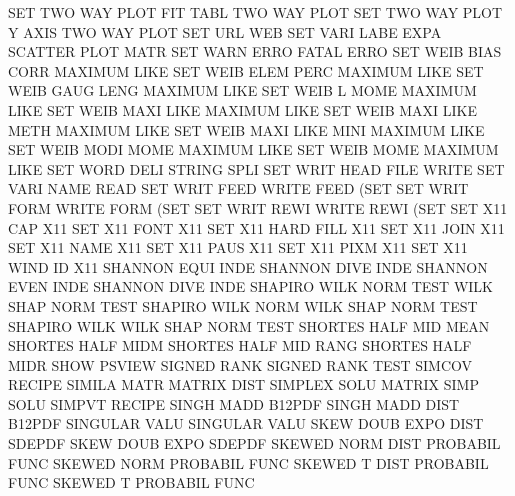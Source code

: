 SET      TWO  WAY  PLOT FIT  TABL       TWO      WAY  PLOT
SET      TWO  WAY  PLOT Y    AXIS       TWO      WAY  PLOT
SET      URL                            WEB
SET      VARI LABE EXPA                 SCATTER  PLOT MATR
SET      WARN ERRO                      FATAL    ERRO
SET      WEIB BIAS CORR                 MAXIMUM  LIKE
SET      WEIB ELEM PERC                 MAXIMUM  LIKE
SET      WEIB GAUG LENG                 MAXIMUM  LIKE
SET      WEIB L    MOME                 MAXIMUM  LIKE
SET      WEIB MAXI LIKE                 MAXIMUM  LIKE
SET      WEIB MAXI LIKE METH            MAXIMUM  LIKE
SET      WEIB MAXI LIKE MINI            MAXIMUM  LIKE
SET      WEIB MODI MOME                 MAXIMUM  LIKE
SET      WEIB MOME                      MAXIMUM  LIKE
SET      WORD DELI                      STRING   SPLI
SET      WRIT HEAD FILE                 WRITE
SET      VARI NAME                      READ
SET      WRIT FEED                      WRITE    FEED (SET
SET      WRIT FORM                      WRITE    FORM (SET
SET      WRIT REWI                      WRITE    REWI (SET
SET      X11  CAP                       X11
SET      X11  FONT                      X11
SET      X11  HARD FILL                 X11
SET      X11  JOIN                      X11
SET      X11  NAME                      X11
SET      X11  PAUS                      X11
SET      X11  PIXM                      X11
SET      X11  WIND ID                   X11
SHANNON  EQUI INDE                      SHANNON  DIVE INDE
SHANNON  EVEN INDE                      SHANNON  DIVE INDE
SHAPIRO  WILK NORM TEST                 WILK     SHAP NORM TEST
SHAPIRO  WILK NORM                      WILK     SHAP NORM TEST
SHAPIRO  WILK                           WILK     SHAP NORM TEST
SHORTES  HALF MID  MEAN                 SHORTES  HALF MIDM
SHORTES  HALF MID  RANG                 SHORTES  HALF MIDR
SHOW                                    PSVIEW
SIGNED   RANK                           SIGNED   RANK TEST
SIMCOV                                  RECIPE
SIMILA   MATR                           MATRIX   DIST
SIMPLEX  SOLU                           MATRIX   SIMP SOLU
SIMPVT                                  RECIPE
SINGH    MADD                           B12PDF
SINGH    MADD DIST                      B12PDF
SINGULAR VALU                           SINGULAR VALU
SKEW     DOUB EXPO DIST                 SDEPDF
SKEW     DOUB EXPO                      SDEPDF
SKEWED   NORM DIST                      PROBABIL FUNC
SKEWED   NORM                           PROBABIL FUNC
SKEWED   T    DIST                      PROBABIL FUNC
SKEWED   T                              PROBABIL FUNC
